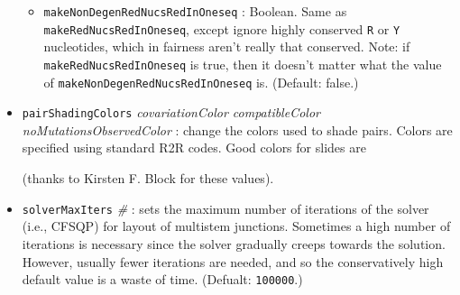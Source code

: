 \documentclass[letterpaper,12pt]{report}
\begin{document}
\begin{itemize}
\begin{itemize}
        \item {\tt makeNonDegenRedNucsRedInOneseq} : Boolean.  Same as {\tt makeRedNucsRedInOneseq}, except ignore highly conserved {\tt R} or {\tt Y} nucleotides, which in fairness aren't really that conserved.  Note: if {\tt makeRedNucsRedInOneseq} is true, then it doesn't matter what the value of {\tt makeNonDegenRedNucsRedInOneseq} is. (Default: false.)
	\end{itemize}
\item {\tt pairShadingColors}  \textit{covariationColor  compatibleColor 
noMutationsObservedColor }: change the colors used to shade pairs. 
Colors are specified using standard R2R codes.  Good colors for slides
are 

\begin{quote}
\hspace*{-24pt}{\tt SetDrawingParam pairShadingColors rgb:156,199,153 rgb:152,199,222 rgb:235,138,126}
\end{quote}
(thanks to Kirsten F. Block for these values).
\item {\tt solverMaxIters} {\it \#} : sets the maximum number of iterations of the solver (i.e., CFSQP) for 
layout of multistem junctions.  Sometimes a high number of iterations is necessary since the solver gradually
creeps towards the solution.  However, usually fewer iterations are needed, and so the conservatively high default
value is a waste of time.  (Defualt: {\tt 100000}.)


\end{itemize}
\end{document}
